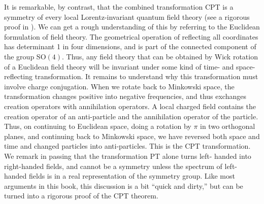 It is remarkable, by contrast, that the combined transformation CPT is a symmetry
of every local Lorentz-invariant quantum field theory (see a rigorous proof in \cite{banks-ref-11}).
We can get a rough understanding of this by referring to the Euclidean formulation of
field theory. The geometrical operation of reflecting all coordinates has determinant 1
in four dimensions, and is part of the connected component of the group $\mathrm{SO}(4)$. Thus,
any field theory that can be obtained by Wick rotation of a Euclidean field theory will
be invariant under some kind of time- and space-reflecting transformation. It remains
to understand why this transformation must involve charge conjugation. When we
rotate back to Minkowski space, the transformation changes positive into negative
frequencies, and thus exchanges creation operators with annihilation operators. A local
charged field contains the creation operator of an anti-particle and the annihilation
operator of the particle. Thus, on continuing to Euclidean space, doing a rotation
by $\pi$ in two orthogonal planes, and continuing back to Minkowski space, we have
reversed both space and time and changed particles into anti-particles. This is the CPT
transformation. We remark in passing that the transformation PT alone turns left-
handed into right-handed fields, and cannot be a symmetry unless the spectrum of left-
handed fields is in a real representation of the symmetry group. Like most arguments
in this book, this discussion is a bit ``quick and dirty,'' but can be turned into a rigorous
proof of the CPT theorem.
